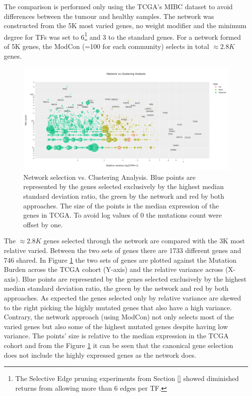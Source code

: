 The comparison is performed only using the TCGA's MIBC dataset to avoid differences between the tumour and healthy samples. The network was constructed from the 5K most varied genes, no weight modifier and the minimum degree for TFs  was set to 6\footnote{The Selective Edge pruning experiments from Section \ref{} showed diminished returns from allowing more than 6 edges per TF.} and 3 to the standard genes. For a network formed of 5K genes, the ModCon (=100 for each community) selects in total $\approx2.8K$ genes.


\begin{figure}[!htb]    \centering\includegraphics[width=1.0\textwidth,height=0.7\textheight,keepaspectratio]{Sections/Network_I/Resources/Tum_network/ClusteringAnalysis_vs_Network_3.png}
    \caption{Network selection vs. Clustering Analysis. Blue points are represented by the genes selected exclusively by the highest median standard deviation ratio, the green by the network and red by both approaches. The size of the points is the median expression of the genes in TCGA. To avoid log values of 0 the mutations count were offset by one.}
    \label{fig:N_I:network_ca_selection}
\end{figure}


The $\approx2.8K$ genes selected through the network are compared with the 3K most relative varied. Between the two sets of genes there are 1733 different genes and 746 shared. In Figure \ref{fig:N_I:network_ca_selection} the two sets of genes are plotted against the Mutation Burden across the TCGA cohort (Y-axis) and the relative variance across (X-axis). Blue points are represented by the genes selected exclusively by the highest median standard deviation ratio, the green by the network and red by both approaches. As expected the genes selected only by relative variance are skewed to the right picking the highly mutated genes that also have a high variance. Contrary, the network approach (using ModCon) not only selects most of the varied genes but also some of the highest mutated genes despite having low variance. The points' size is relative to the median expression in the TCGA cohort and from the Figure \ref{fig:N_I:network_ca_selection} it can be seen that the canonical gene selection does not include the highly expressed genes as the network does.

